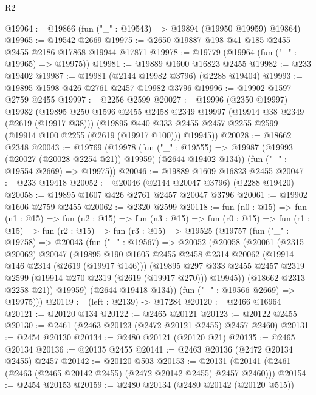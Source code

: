\begin{lexlean}{R2}
\begin{coremodule}
@19964 := @19866 (fun ("_" : @19543) => @19894 (@19950 @19959) @19864)
@19965 := @19542 @2669
@19975 := @2650 @19887 @198 @41 @185 @2455 @2455 @2186 @17868 @19944 @17871
@19978 := @19779 (@19964 (fun ("_" : @19965) => @19975))
@19981 := @19889 @1600 @16823 @2455
@19982 := @233 @19402
@19987 := @19981 (@2144 @19982 @3796) (@2288 @19404)
@19993 := @19895 @1598 @426 @2761 @2457 @19982 @3796
@19996 := @19902 @1597 @2759 @2455
@19997 := @2256 @2599
@20027 := @19996
    (@2350 @19997)
    @19982
    (@19895
      @250
      @1596
      @2455
      @2458
      @2349
      @19997
      (@19914 @38 @2349 (@2619 (@19917 @38)))
      (@19895 @440 @333 @2455 @2457 @2255 @2599 (@19914 @100 @2255 (@2619 (@19917 @100))) @19945))
@20028 := @18662 @2348
@20043 := @19769
    (@19978
      (fun ("_" : @19555) => @19987 (@19993 (@20027 (@20028 @2254 @21)) @19959) (@2644 @19402 @134))
      (fun ("_" : @19554 @2669) => @19975))
@20046 := @19889 @1609 @16823 @2455
@20047 := @233 @19418
@20052 := @20046 (@2144 @20047 @3796) (@2288 @19420)
@20058 := @19895 @1607 @426 @2761 @2457 @20047 @3796
@20061 := @19902 @1606 @2759 @2455
@20062 := @2320 @2599
@20118 := fun (n0 : @15) =>
  fun (n1 : @15) =>
  fun (n2 : @15) =>
  fun (n3 : @15) =>
  fun (r0 : @15) =>
  fun (r1 : @15) =>
  fun (r2 : @15) =>
  fun (r3 : @15) =>
  @19525
    (@19757
      (fun ("_" : @19758) =>
      @20043
        (fun ("_" : @19567) =>
        @20052
          (@20058
            (@20061
              (@2315 @20062)
              @20047
              (@19895
                @190
                @1605
                @2455
                @2458
                @2314
                @20062
                (@19914 @146 @2314 (@2619 (@19917 @146)))
                (@19895
                  @297
                  @333
                  @2455
                  @2457
                  @2319
                  @2599
                  (@19914 @270 @2319 (@2619 (@19917 @270)))
                  @19945))
              (@18662 @2313 @2258 @21))
            @19959)
          (@2644 @19418 @134))
        (fun ("_" : @19566 @2669) => @19975)))
@20119 := (left : @2139) -> @17284
@20120 := @2466 @16964
@20121 := @20120 @134
@20122 := @2465 @20121
@20123 := @20122 @2455
@20130 := @2461 (@2463 @20123 (@2472 @20121 @2455) @2457 @2460)
@20131 := @2454 @20130
@20134 := @2480 @20121 (@20120 @21)
@20135 := @2465 @20134
@20136 := @20135 @2455
@20141 := @2463 @20136 (@2472 @20134 @2455) @2457
@20142 := @20120 @503
@20153 := @20131 (@20141 (@2461 (@2463 (@2465 @20142 @2455) (@2472 @20142 @2455) @2457 @2460)))
@20154 := @2454 @20153
@20159 := @2480 @20134 (@2480 @20142 (@20120 @515))

\end{coremodule}
\end{lexlean}
